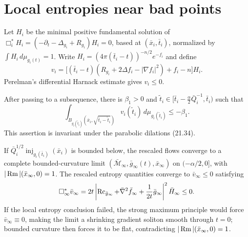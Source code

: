 \section{Local entropies near bad points}

\begin{definition}
\label{def:chow-iii-adjoint-entropy-quantities}


Let \(H_i\) be the minimal positive fundamental solution of
\(\Box_i^*H_i=(-\partial_t-\Delta_{g_i}+R_{g_i})H_i=0\), based at
\((\bar x_i,\bar t_i)\), normalized by \(\int H_i\,d\mu_{g_i(t)}=1\).  Write
\(H_i=(4\pi(\bar t_i-t))^{-n/2}e^{-f_i}\) and define
\[
v_i=\bigl[(\bar t_i-t)(R_{g_i}+2\Delta f_i-|\nabla f_i|^2)+f_i-n\bigr]H_i.
\]
Perelman's differential Harnack estimate gives \(v_i\le0\).
\end{definition}

\begin{theorem}
\label{clm:chow-iii-uniform-negative-local-entropy}


After passing to a subsequence, there is \(\beta_1>0\) and
\(\widetilde t_i\in[\bar t_i-\frac\alpha2\bar Q_i^{-1},\bar t_i)\) such that
\[
\int_{B_{g_i(\widetilde t_i)}(\bar x_i,\sqrt{\bar t_i-\widetilde t_i})}
v_i(\widetilde t_i)\,d\mu_{g_i(\widetilde t_i)}\le-\beta_1.
\]
This assertion is invariant under the parabolic dilations (21.34).
\end{theorem}

\begin{lemma}
\label{lem:chow-iii-noncollapsed-entropy-limit}


If \(\bar Q_i^{1/2}\operatorname{inj}_{g_i(\bar t_i)}(\bar x_i)\) is bounded below, the
rescaled flows converge to a complete bounded-curvature limit
\((\bar{\mathcal M}_\infty,\bar g_\infty(t),\bar x_\infty)\) on
\((-\alpha/2,0]\), with \(|\operatorname{Rm}|(\bar x_\infty,0)=1\).  The rescaled entropy
quantities converge to \(\bar v_\infty\le0\) satisfying
\[
\Box_\infty^*\bar v_\infty
 =2t\left|\operatorname{Rc}_{\bar g_\infty}+\bar\nabla^2\bar f_\infty+\frac1{2t}\bar g_\infty\right|^2\bar H_\infty\le0.
\]
If the local entropy conclusion failed, the strong maximum principle would
force \(\bar v_\infty\equiv0\), making the limit a shrinking gradient soliton
smooth through \(t=0\); bounded curvature then forces it to be flat, contradicting
\(|\operatorname{Rm}|(\bar x_\infty,0)=1\).
\end{lemma}

